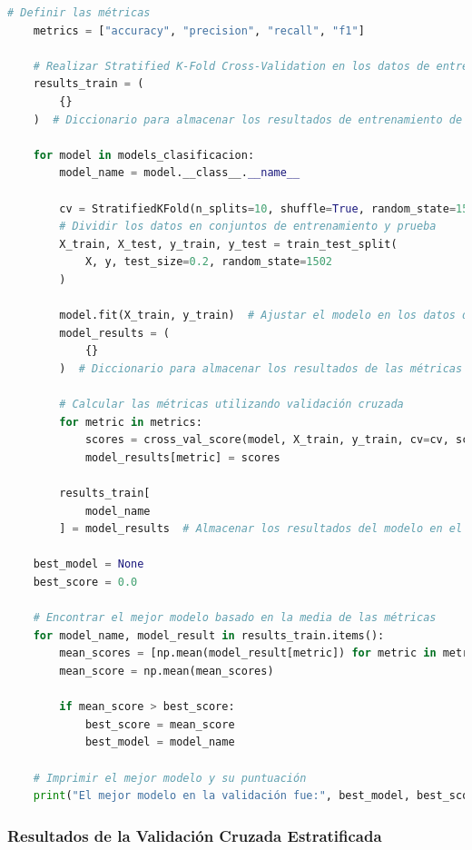 \begin{lstlisting}[language=Python, caption=Aplicación de Stratified K-Fold y entrenamiento de modelos, label=lst:stratified_kfold]
    # Definir las métricas
    metrics = ["accuracy", "precision", "recall", "f1"]

    # Realizar Stratified K-Fold Cross-Validation en los datos de entrenamiento y obtener las métricas para cada modelo
    results_train = (
        {}
    )  # Diccionario para almacenar los resultados de entrenamiento de cada modelo

    for model in models_clasificacion:
        model_name = model.__class__.__name__

        cv = StratifiedKFold(n_splits=10, shuffle=True, random_state=1502)
        # Dividir los datos en conjuntos de entrenamiento y prueba
        X_train, X_test, y_train, y_test = train_test_split(
            X, y, test_size=0.2, random_state=1502
        )

        model.fit(X_train, y_train)  # Ajustar el modelo en los datos de entrenamiento
        model_results = (
            {}
        )  # Diccionario para almacenar los resultados de las métricas para el modelo actual

        # Calcular las métricas utilizando validación cruzada
        for metric in metrics:
            scores = cross_val_score(model, X_train, y_train, cv=cv, scoring=metric)
            model_results[metric] = scores

        results_train[
            model_name
        ] = model_results  # Almacenar los resultados del modelo en el diccionario

    best_model = None
    best_score = 0.0

    # Encontrar el mejor modelo basado en la media de las métricas
    for model_name, model_result in results_train.items():
        mean_scores = [np.mean(model_result[metric]) for metric in metrics]
        mean_score = np.mean(mean_scores)

        if mean_score > best_score:
            best_score = mean_score
            best_model = model_name

    # Imprimir el mejor modelo y su puntuación
    print("El mejor modelo en la validación fue:", best_model, best_score)
\end{lstlisting}


\subsubsection{Resultados de la Validación Cruzada Estratificada}

